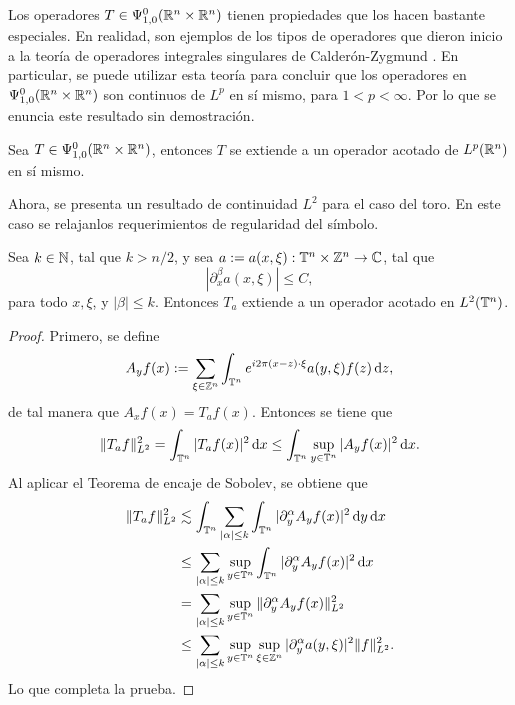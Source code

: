 \begin{remark}
	Los operadores $T\in\Psi^0_{1, 0}(\mathbb{R}^n\times\mathbb{R}^n)$ tienen propiedades que los hacen bastante especiales. En realidad, son ejemplos de los tipos de operadores que dieron inicio a la teoría de operadores integrales singulares de Calderón-Zygmund \cite{calderon-zygmund}. En particular, se puede utilizar esta teoría para concluir que los operadores en $\Psi^0_{1, 0}(\mathbb{R}^n\times\mathbb{R}^n)$ son continuos de $L^p$ en sí mismo, para $1<p<\infty$. Por lo que se enuncia este resultado sin demostración.
\end{remark}
\begin{theorem}\label{theo:Lp-boundedness-S0}
	Sea $T\in\Psi^0_{1, 0}(\mathbb{R}^n\times\mathbb{R}^n)$, entonces $T$ se extiende a un operador acotado de $L^p(\mathbb{R}^n)$ en sí mismo.
\end{theorem}
Ahora, se presenta un resultado de continuidad $L^2$ para el caso del toro. En este caso se relajanlos requerimientos de regularidad del símbolo.
\begin{theorem}
	Sea $k\in\mathbb{N}$, tal que $k>n/2$, y sea $a:=a(x,\xi):\mathbb{T}^n\times\mathbb{Z}^n\to\mathbb{C}$, tal que
	\begin{equation*}
		|\partial^\beta_x a(x, \xi)| \leq C,
	\end{equation*}
	para todo $x, \xi$, y $|\beta|\leq k$. Entonces $T_a$ extiende a un operador acotado en $L^2(\mathbb{T}^n)$.
\end{theorem}
\begin{proof}
	Primero, se define 
	\begin{equation*}
		A_yf(x) := \sum_{\xi\in\mathbb{Z}^n} \int_{\mathbb{T}^n} e^{i2\pi (x-z)\cdot\xi} a(y, \xi) f(z) \mathop{}\!\mathrm{d} z, 
	\end{equation*}
	de tal manera que $A_xf(x) = T_af(x)$. Entonces se tiene que
	\begin{equation*}
		\|T_af\|_{L^2}^2 = \int_{\mathbb{T}^n} |T_af(x)|^2 \mathop{}\!\mathrm{d} x \leq \int_{\mathbb{T}^n} \sup_{y\in\mathbb{T}^n} |A_yf(x)|^2 \mathop{}\!\mathrm{d} x.
	\end{equation*}
	Al aplicar el Teorema de encaje de Sobolev, se obtiene que
	\begin{align*}
		\|T_af\|_{L^2}^2 & \lesssim \int_{\mathbb{T}^n} \sum_{|\alpha|\leq k} \int_{\mathbb{T}^n} |\partial^\alpha_yA_yf(x)|^2 \mathop{}\!\mathrm{d} y \mathop{}\!\mathrm{d} x \\
		& \leq \sum_{|\alpha|\leq k} \sup_{y\in\mathbb{T}^n}  \int_{\mathbb{T}^n} |\partial^\alpha_yA_yf(x)|^2 \mathop{}\!\mathrm{d} x\\
		& =  \sum_{|\alpha|\leq k} \sup_{y\in\mathbb{T}^n} \|\partial^\alpha_yA_yf(x)\|_{L^2}^2 \\
		& \leq \sum_{|\alpha|\leq k} \sup_{y\in\mathbb{T}^n}  \sup_{\xi\in\mathbb{Z}^n} |\partial^\alpha_y a(y, \xi)|^2 \|f\|_{L^2}^2.
	\end{align*}
	Lo que completa la prueba.
\end{proof}

